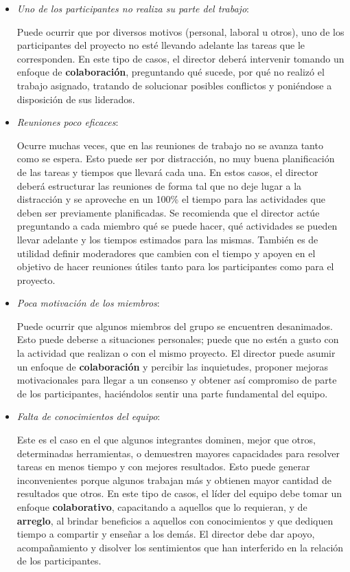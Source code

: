 \begin{itemize}
\item \textit{Uno de los participantes no realiza su parte del trabajo}:

Puede ocurrir que por diversos motivos (personal, laboral u otros), uno de los participantes del proyecto no esté llevando adelante las tareas que le corresponden.
En este tipo de casos, el director deberá intervenir tomando un enfoque de \textbf{colaboración}, preguntando qué sucede, por qué no realizó el trabajo asignado, tratando de solucionar posibles conflictos y poniéndose a disposición de sus liderados.

\item \textit{Reuniones poco eficaces}:

Ocurre muchas veces, que en las reuniones de trabajo no se avanza tanto como se espera.
Esto puede ser por distracción, no muy buena planificación de las tareas y tiempos que llevará cada una.
En estos casos, el director deberá estructurar las reuniones de forma tal que no deje lugar a la distracción y se aproveche en un 100\% el tiempo para las actividades que deben ser previamente planificadas.
Se recomienda que el director actúe preguntando a cada miembro qué se puede hacer, qué actividades se pueden llevar adelante y los tiempos estimados para las mismas.
También es de utilidad definir moderadores que cambien con el tiempo y apoyen en el objetivo de hacer reuniones útiles tanto para los participantes como para el proyecto.

\item \textit{Poca motivación de los miembros}:

Puede ocurrir que algunos miembros del grupo se encuentren desanimados.
Esto puede deberse a situaciones personales; puede que no estén a gusto con la actividad que realizan o con el mismo proyecto.
El director puede asumir un enfoque de \textbf{colaboración} y percibir las inquietudes, proponer mejoras motivacionales para llegar a un consenso y obtener así compromiso de parte de los participantes, haciéndolos sentir una parte fundamental del equipo.

\item \textit{Falta de conocimientos del equipo}:

Este es el caso en el que algunos integrantes dominen, mejor que otros, determinadas herramientas, o demuestren mayores capacidades para resolver tareas en menos tiempo y con mejores resultados.
Esto puede generar inconvenientes porque algunos trabajan más y obtienen mayor cantidad de resultados que otros.
En este tipo de casos, el líder del equipo debe tomar un enfoque \textbf{colaborativo}, capacitando a aquellos que lo requieran, y de \textbf{arreglo}, al brindar beneficios a aquellos con conocimientos y que dediquen tiempo a compartir y enseñar a los demás.
El director debe dar apoyo, acompañamiento y disolver los sentimientos que han interferido en la relación de los participantes.

\end{itemize}



